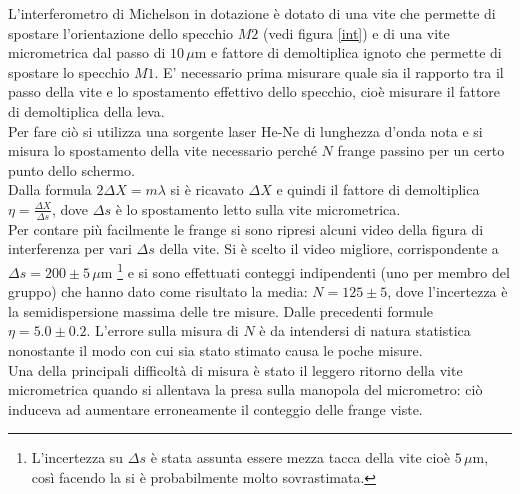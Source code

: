 \documentclass[10pt,a4paper]{article}
\begin{document}
L'interferometro di Michelson in dotazione è dotato di una vite che permette di spostare l'orientazione dello specchio $M2$ (vedi figura \ref{int}) e di una vite micrometrica dal passo di $10 \, \mu \mbox{m}$ e fattore di demoltiplica ignoto che permette di spostare lo specchio $M1$. E' necessario prima misurare quale sia il rapporto tra il passo della vite e lo spostamento effettivo dello specchio, cioè misurare il fattore di demoltiplica della leva. \\
Per fare ciò si utilizza una sorgente laser He-Ne di lunghezza d'onda nota e si misura lo spostamento della vite necessario perché $N$ frange passino per un certo punto dello schermo. \\
Dalla formula $2 \Delta X = m \lambda$ si è ricavato $\Delta X$ e quindi il fattore di demoltiplica $\eta = \frac{\Delta X}{\Delta s}$, dove $\Delta s$ è lo spostamento letto sulla vite micrometrica.\\
Per contare più facilmente le frange si sono ripresi alcuni video della figura di interferenza per vari $\Delta s$ della vite. Si è scelto il video migliore, corrispondente a $\Delta s = 200 \pm 5 \, \mu \mbox{m}$ \footnote{L'incertezza su $\Delta s$ è stata assunta essere mezza tacca della vite cioè $5 \, \mu \mbox{m}$, così facendo la si è probabilmente molto sovrastimata.} e si sono effettuati conteggi indipendenti (uno per membro del gruppo) che hanno dato come risultato la media: $N = 125 \pm 5$, dove l'incertezza è la semidispersione massima delle tre misure. Dalle precedenti formule $\eta = 5.0 \pm 0.2$. L'errore sulla misura di $N$ è da intendersi di natura statistica nonostante il modo con cui sia stato stimato causa le poche misure.\\
Una della principali difficoltà di misura è stato il leggero ritorno della vite micrometrica quando si allentava la presa sulla manopola del micrometro: ciò induceva ad aumentare erroneamente il conteggio delle frange viste.\\
\end{document}

